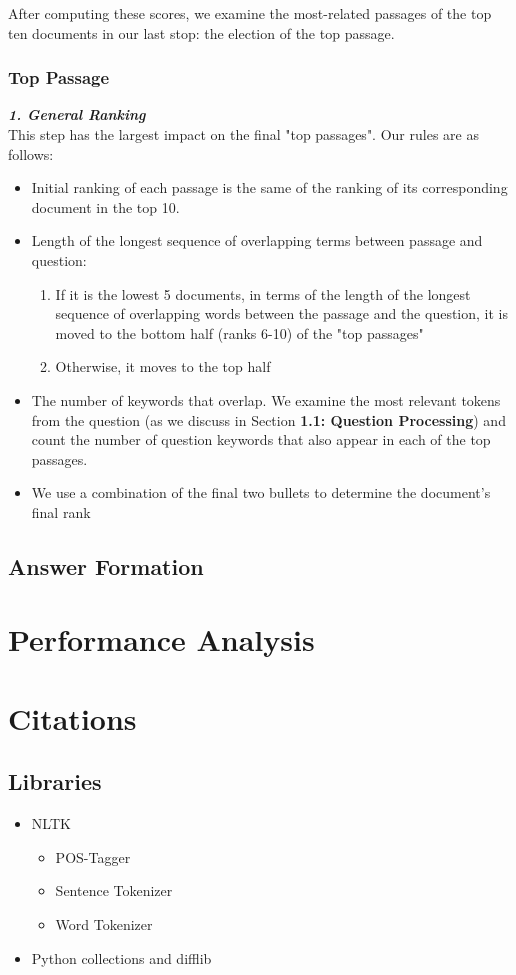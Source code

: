 \documentclass{article}
\begin{document}
After computing these scores, we examine the most-related passages of the top ten documents in our last stop: the election of the top passage.

\subsubsection{Top Passage}
\textbf{\textit{1. General Ranking}}\\
This step has the largest impact on the final "top passages". Our rules are as follows:\\
\begin{itemize}
\item Initial ranking of each passage is the same of the ranking of its corresponding document in the top 10.
\item Length of the longest sequence of overlapping terms between passage and question:
	\begin{enumerate}
	\item If it is the lowest 5 documents, in terms of the length of the longest sequence of overlapping words between the passage and the question, it is moved to the bottom half (ranks 6-10) of the "top passages"
	\item Otherwise, it moves to the top half
	\end{enumerate}
\item The number of keywords that overlap. We examine the most relevant tokens from the question (as we discuss in Section \textbf{1.1: Question Processing}) and count the number of question keywords that also appear in each of the top passages.
\item We use a combination of the final two bullets to determine the document's final rank
\end{itemize}


\subsection{Answer Formation}

\section{Performance Analysis}

\section{Citations}
\subsection{Libraries}
\begin{itemize}
\item NLTK
	\begin{itemize}
	\item POS-Tagger
	\item Sentence Tokenizer
	\item Word Tokenizer
	\end{itemize}
\item Python collections and difflib
\end{itemize}
\end{document}
